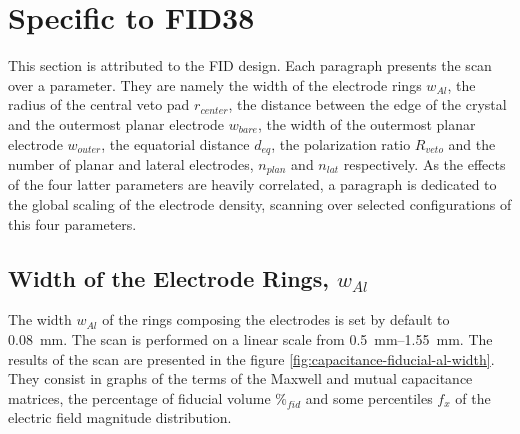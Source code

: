 

\section{Specific to FID38}

This section is attributed to the FID design. Each paragraph presents the scan over a parameter. They are namely the width of the electrode rings $w_{Al}$, the radius of the central veto pad $r_{center}$, the distance between the edge of the crystal and the outermost planar electrode $w_{bare}$, the width of the outermost planar electrode $w_{outer}$, the equatorial distance $d_{eq}$, the polarization ratio $R_{veto}$ and the number of planar and lateral electrodes, $n_{plan}$ and $n_{lat}$ respectively. As the effects of the four latter parameters are heavily correlated, a paragraph is dedicated to the global scaling of the electrode density, scanning over selected configurations of this four parameters.


\subsection{Width of the Electrode Rings, $w_{Al}$}

The width $w_{Al}$ of the rings composing the electrodes is set by default to \SI{0.08}{\mm}. The scan is performed on a linear scale from \SIrange{0.5}{1.55}{\mm}. The results of the scan are presented in the figure \ref{fig:capacitance-fiducial-al-width}. They consist in graphs of the terms of the Maxwell and mutual capacitance matrices, the percentage of fiducial volume $\%_{fid}$ and some percentiles $f_x$ of the electric field magnitude distribution.

